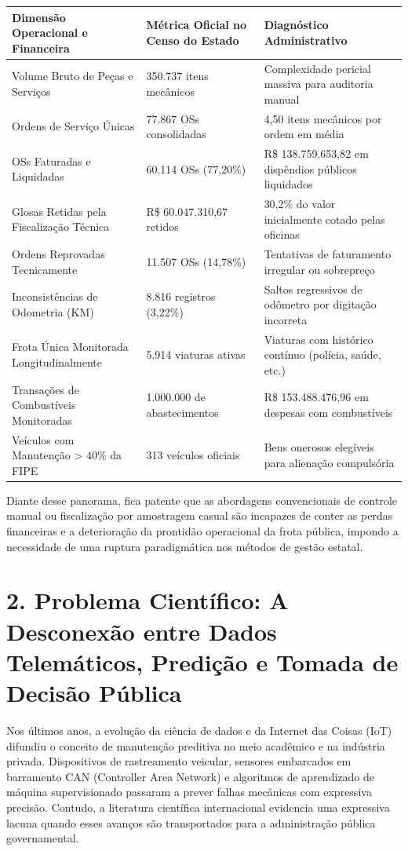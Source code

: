 \documentclass[10pt,a4paper,journal]{article}
\begin{document}
\begin{table}[htbp]
\centering
\small
\begin{tabular}{lll}
\toprule
Dimensão Operacional e Financeira & Métrica Oficial no Censo do Estado & Diagnóstico Administrativo \\
\midrule
Volume Bruto de Peças e Serviços & 350.737 itens mecânicos & Complexidade pericial massiva para auditoria manual \\
Ordens de Serviço Únicas & 77.867 OSs consolidadas & 4,50 itens mecânicos por ordem em média \\
OSs Faturadas e Liquidadas & 60.114 OSs (77,20\%) & R\$ 138.759.653,82 em dispêndios públicos liquidados \\
Glosas Retidas pela Fiscalização Técnica & R\$ 60.047.310,67 retidos & 30,2\% do valor inicialmente cotado pelas oficinas \\
Ordens Reprovadas Tecnicamente & 11.507 OSs (14,78\%) & Tentativas de faturamento irregular ou sobrepreço \\
Inconsistências de Odometria (KM) & 8.816 registros (3,22\%) & Saltos regressivos de odômetro por digitação incorreta \\
Frota Única Monitorada Longitudinalmente & 5.914 viaturas ativas & Viaturas com histórico contínuo (polícia, saúde, etc.) \\
Transações de Combustíveis Monitoradas & 1.000.000 de abastecimentos & R\$ 153.488.476,96 em despesas com combustíveis \\
Veículos com Manutenção > 40\% da FIPE & 313 veículos oficiais & Bens onerosos elegíveis para alienação compulsória \\
\bottomrule
\end{tabular}
\end{table}
Diante desse panorama, fica patente que as abordagens convencionais de controle manual ou fiscalização por amostragem casual são incapazes de conter as perdas financeiras e a deterioração da prontidão operacional da frota pública, impondo a necessidade de uma ruptura paradigmática nos métodos de gestão estatal.

\section{2. Problema Científico: A Desconexão entre Dados Telemáticos, Predição e Tomada de Decisão Pública}
Nos últimos anos, a evolução da ciência de dados e da Internet das Coisas (IoT) difundiu o conceito de manutenção preditiva no meio acadêmico e na indústria privada. Dispositivos de rastreamento veicular, sensores embarcados em barramento CAN (Controller Area Network) e algoritmos de aprendizado de máquina supervisionado passaram a prever falhas mecânicas com expressiva precisão. Contudo, a literatura científica internacional evidencia uma expressiva lacuna quando esses avanços são transportados para a administração pública governamental.
\end{document}
